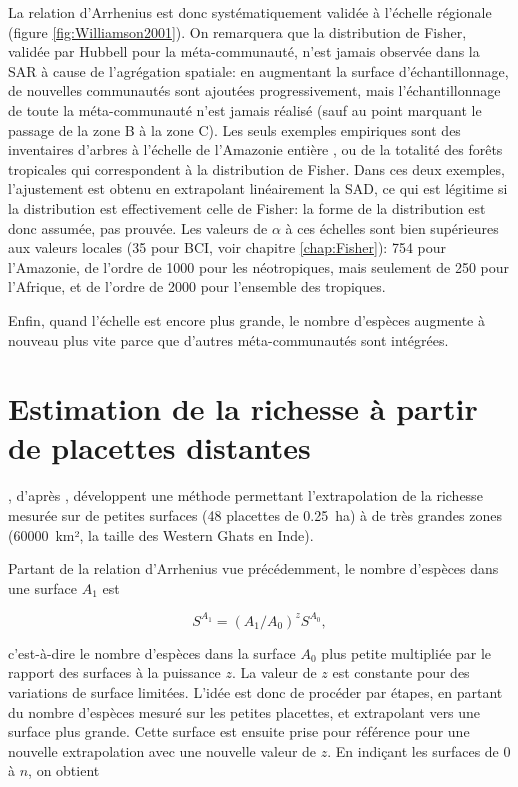 \documentclass[
  11pt,
  french,
  a4paper,
  extrafontsizes,onecolumn,openright
  ]{memoir}
\newlength{\rf}
\begin{document}
La relation d'Arrhenius est donc systématiquement validée à l'échelle régionale (figure \ref{fig:Williamson2001}).
On remarquera que la distribution de Fisher, validée par Hubbell pour la méta-communauté, n'est jamais observée dans la SAR à cause de l'agrégation spatiale: en augmentant la surface d'échantillonnage, de nouvelles communautés sont ajoutées progressivement, mais l'échantillonnage de toute la méta-communauté n'est jamais réalisé (sauf au point marquant le passage de la zone B à la zone C).
Les seuls exemples empiriques sont des inventaires d'arbres à l'échelle de l'Amazonie entière \autocite{TerSteege2013}, ou de la totalité des forêts tropicales \autocite{Slik2015} qui correspondent à la distribution de Fisher. Dans ces deux exemples, l'ajustement est obtenu en extrapolant linéairement la SAD, ce qui est légitime \autocite{Izsak2012} si la distribution est effectivement celle de Fisher: la forme de la distribution est donc assumée, pas prouvée.
Les valeurs de \(\alpha\) à ces échelles sont bien supérieures aux valeurs locales (35 pour BCI, voir chapitre \ref{chap:Fisher}): 754 pour l'Amazonie, de l'ordre de 1000 pour les néotropiques, mais seulement de 250 pour l'Afrique, et de l'ordre de 2000 pour l'ensemble des tropiques.

Enfin, quand l'échelle est encore plus grande, le nombre d'espèces augmente à nouveau plus vite parce que d'autres méta-communautés sont intégrées.

\hypertarget{estimation-de-la-richesse-uxe0-partir-de-placettes-distantes}{%
\section{Estimation de la richesse à partir de placettes distantes}\label{estimation-de-la-richesse-uxe0-partir-de-placettes-distantes}}

\textcite{Krishnamani2004}, d'après \textcite{Harte1999}, développent une méthode permettant l'extrapolation de la richesse mesurée sur de petites surfaces (48 placettes de 0.25~ha) à de très grandes zones (60000~km², la taille des Western Ghats en Inde).

Partant de la relation d'Arrhenius vue précédemment, le nombre d'espèces dans une surface \(A_1\) est

\begin{equation}
  \label{eq:NsA1}
  S^{A_1} = \left({A_1}/{A_0}\right)^z{S^{A_0}},
\end{equation}

c'est-à-dire le nombre d'espèces dans la surface \(A_0\) plus petite multipliée par le rapport des surfaces à la puissance \(z\).
La valeur de \(z\) est constante pour des variations de surface limitées.
L'idée est donc de procéder par étapes, en partant du nombre d'espèces mesuré sur les petites placettes, et extrapolant vers une surface plus grande.
Cette surface est ensuite prise pour référence pour une nouvelle extrapolation avec une nouvelle valeur de \(z\).
En indiçant les surfaces de 0 à \(n\), on obtient
\end{document}
